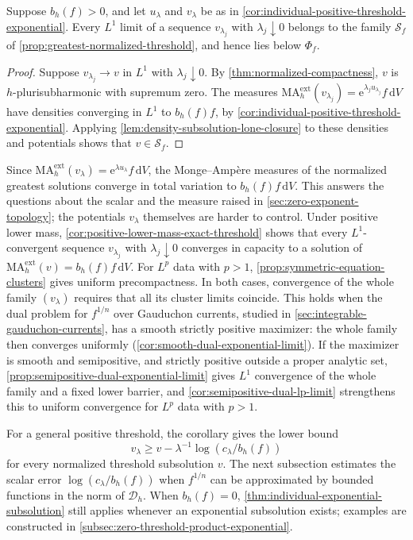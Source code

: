 \begin{corollary}\label{cor:exponential-cluster-threshold-subsolutions}
Suppose $b_h(f)>0$, and let $u_\lambda$ and $v_\lambda$ be as in \cref{cor:individual-positive-threshold-exponential}. Every $L^1$ limit of a sequence $v_{\lambda_j}$ with $\lambda_j\downarrow0$ belongs to the family $\mathcal S_f$ of \cref{prop:greatest-normalized-threshold}, and hence lies below $\Phi_f$.
\end{corollary}
\begin{proof}
Suppose $v_{\lambda_j}\to v$ in $L^1$ with $\lambda_j\downarrow0$. By \cref{thm:normalized-compactness}, $v$ is $h$-plurisubharmonic with supremum zero. The measures $\mathrm{MA}^{\mathrm{ext}}_h(v_{\lambda_j})=\mathrm{e}^{\lambda_ju_{\lambda_j}}f\,\mathrm{d}V$ have densities converging in $L^1$ to $b_h(f)f$, by \cref{cor:individual-positive-threshold-exponential}. Applying \cref{lem:density-subsolution-lone-closure} to these densities and potentials shows that $v\in\mathcal S_f$.
\end{proof}

Since $\mathrm{MA}^{\mathrm{ext}}_h(v_\lambda)=\mathrm{e}^{\lambda u_\lambda}f\,\mathrm{d}V$, the Monge--Amp\`ere measures of the normalized greatest solutions converge in total variation to $b_h(f)f\,\mathrm{d}V$. This answers the questions about the scalar and the measure raised in \cref{sec:zero-exponent-topology}; the potentials $v_\lambda$ themselves are harder to control. Under positive lower mass, \cref{cor:positive-lower-mass-exact-threshold} shows that every $L^1$-convergent sequence $v_{\lambda_j}$ with $\lambda_j\downarrow0$ converges in capacity to a solution of $\mathrm{MA}^{\mathrm{ext}}_h(v)=b_h(f)f\,\mathrm{d}V$. For $L^p$ data with $p>1$, \cref{prop:symmetric-equation-clusters} gives uniform precompactness. In both cases, convergence of the whole family $(v_\lambda)$ requires that all its cluster limits coincide. This holds when the dual problem for $f^{1/n}$ over Gauduchon currents, studied in \cref{sec:integrable-gauduchon-currents}, has a smooth strictly positive maximizer: the whole family then converges uniformly (\cref{cor:smooth-dual-exponential-limit}). If the maximizer is smooth and semipositive, and strictly positive outside a proper analytic set, \cref{prop:semipositive-dual-exponential-limit} gives $L^1$ convergence of the whole family and a fixed lower barrier, and \cref{cor:semipositive-dual-lp-limit} strengthens this to uniform convergence for $L^p$ data with $p>1$.

For a general positive threshold, the corollary gives the lower bound
\[
 v_\lambda\geq v-\lambda^{-1}\log(c_\lambda/b_h(f))
\]
for every normalized threshold subsolution $v$. The next subsection estimates the scalar error $\log(c_\lambda/b_h(f))$ when $f^{1/n}$ can be approximated by bounded functions in the norm of $\mathcal D_h$. When $b_h(f)=0$, \cref{thm:individual-exponential-subsolution} still applies whenever an exponential subsolution exists; examples are constructed in \cref{subsec:zero-threshold-product-exponential}.

